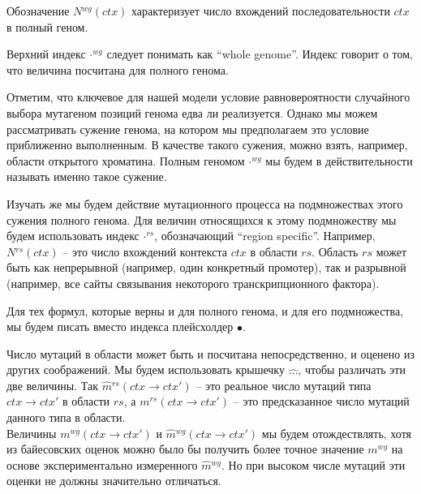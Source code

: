 \documentclass[a4paper]{article}
\newcommand\wg{{}^{wg}}
\newcommand\rs{{}^{rs}}
\newcommand\dirctx{ctx\to ctx'}
\begin{document}
Обозначение $N\wg(ctx)$ характеризует число вхождений последовательности $ctx$ в полный геном.

Верхний индекс $\cdot\wg$ следует понимать как ``whole genome''. Индекс говорит о том, что величина посчитана для полного генома. 

Отметим, что ключевое для нашей модели условие равновероятности случайного выбора мутагеном позиций генома едва ли реализуется. Однако мы можем рассматривать сужение генома, на котором мы предполагаем это условие приближенно выполненным. В качестве такого сужения, можно взять, например, области открытого хроматина. Полным геномом $\cdot\wg$ мы будем в действительности называть именно такое сужение. 

Изучать же мы будем действие мутационного процесса на подмножествах этого сужения полного генома. Для величин относящихся к этому подмножеству мы будем использовать индекс $\cdot\rs$, обозначающий ``region specific''. Например, $N\rs(ctx)$ -- это число вхождений контекста $ctx$ в области $rs$. Область $rs$ может быть как непрерывной (например, один конкретный промотер), так и разрывной (например, все сайты связывания некоторого транскрипционного фактора).

Для тех формул, которые верны и для полного генома, и для его подмножества, мы будем писать вместо индекса плейсхолдер $\bullet$.

Число мутаций в области может быть и посчитана непосредственно, и оценено из других соображений. Мы будем использовать крышечку $\widehat{\dots}$, чтобы различать эти две величины. Так $\widehat{m}\rs(\dirctx)$ -- это реальное число мутаций типа $\dirctx$ в области $rs$, а $m\rs(\dirctx)$ -- это предсказанное число мутаций данного типа в области.\\
Величины $m\wg(\dirctx)$ и $\widehat{m}\wg(\dirctx)$ мы будем отождествлять, хотя из байесовских оценок можно было бы получить более точное значение $m\wg$ на основе экспериментально измеренного $\widehat{m}\wg$. Но при высоком числе мутаций эти оценки не должны значительно отличаться.
\end{document}

